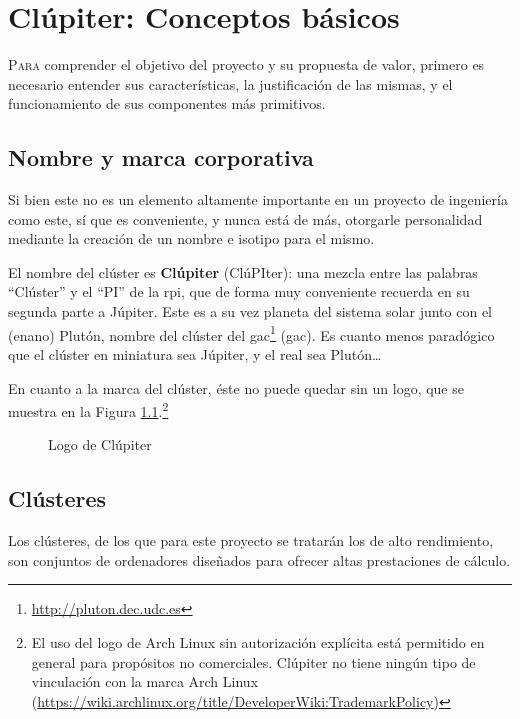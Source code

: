 \chapter{Clúpiter: Conceptos básicos}
\label{chap:conceptos_basicos}

\lettrine{P}{ara} comprender el objetivo del proyecto y su propuesta de valor, primero es necesario entender sus características, la justificación de las mismas, y el funcionamiento de sus componentes más primitivos.

\section{Nombre y marca corporativa}
Si bien este no es un elemento altamente importante en un proyecto de ingeniería como este, sí que es conveniente, y nunca está de más, otorgarle personalidad mediante la creación de un nombre e isotipo para el mismo.

El nombre del clúster es \textbf{Clúpiter} (ClúPIter): una mezcla entre las palabras ``Clúster'' y el ``PI'' de la \acrlong{rpi}, que de forma muy conveniente recuerda en su segunda parte a Júpiter. Este es a su vez planeta del sistema solar junto con el (enano) Plutón, nombre del clúster del \acrshort{gac}\footnote{\url{http://pluton.dec.udc.es}} (\acrlong{gac}). Es cuanto menos paradógico que el clúster en miniatura sea Júpiter, y el real sea Plutón\dots

En cuanto a la marca del clúster, éste no puede quedar sin un logo, que se muestra en la Figura \ref{fig:clupiter_logo}.\footnote{El uso del logo de Arch Linux sin autorización explícita está permitido en general para propósitos no comerciales. Clúpiter no tiene ningún tipo de vinculación con la marca Arch Linux (\url{https://wiki.archlinux.org/title/DeveloperWiki:TrademarkPolicy})}

\begin{figure}[h!]
  \centering
  \vspace*{0.5cm}
  \def\svgwidth{0.50\textwidth}
  
  \caption{Logo de Clúpiter}
  \label{fig:clupiter_logo}
\end{figure}

\section{Clústeres}
Los clústeres, de los que para este proyecto se tratarán los de alto rendimiento, son conjuntos de ordenadores diseñados para ofrecer altas prestaciones de cálculo.

